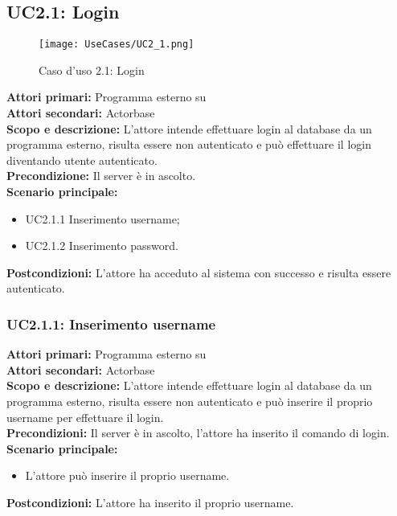 \documentclass{scalatekids-article}
\begin{document}
\subsection{UC2.1: Login}

\begin{figure}[H]
  \begin{center}
    \texttt{[image: UseCases/UC2\_1.png]}
    \caption*{Caso d'uso 2.1: Login}
  \end{center}
\end{figure}
\textbf{Attori primari:} Programma esterno su \\
\textbf{Attori secondari:} Actorbase\\
\textbf{Scopo e descrizione:}
L'attore intende effettuare login al database da un programma  esterno, risulta essere non autenticato e può effettuare il login diventando utente autenticato.\\
\textbf{Precondizione:} Il server è in ascolto.\\
\textbf{Scenario principale:}
\begin{itemize}
\item UC2.1.1 Inserimento username;
\item UC2.1.2 Inserimento password.
\end{itemize}
\textbf{Postcondizioni:} L'attore ha acceduto al sistema con successo e risulta essere autenticato.

\subsubsection{UC2.1.1: Inserimento username}

\textbf{Attori primari:} Programma esterno su \\
\textbf{Attori secondari:} Actorbase\\
\textbf{Scopo e descrizione:}
L'attore intende effettuare login al database da un programma  esterno, risulta essere non autenticato e può inserire il proprio username per effettuare il login.\\
\textbf{Precondizioni:} Il server è in ascolto, l'attore ha inserito il comando di login.\\
\textbf{Scenario principale:}
\begin{itemize}
\item L'attore può inserire il proprio username.
\end{itemize}
\textbf{Postcondizioni:} L'attore ha inserito il proprio username.
\end{document}

